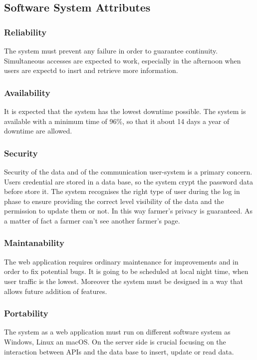 \subsection{Software System Attributes}

\subsubsection{Reliability}
The system must prevent any failure in order to guarantee continuity. 
Simultaneous accesses are expected to work, especially in the afternoon when users are expectd to insrt and retrieve more information.

\subsubsection{Availability}
It is expected that the system has the lowest downtime possible. 
The system is available with a minimum time of 96\%, 
so that it about 14 days a year of downtime are allowed.


\subsubsection{Security}
\label{subsubsection:3.4.3}
Security of the data and of the communication user-system is a primary concern. Users credential are stored in a data base, so the system crypt the password data before store it. The system recognises the right type of user during the log in phase to ensure providing the correct level visibility of the data and the permission to update them or not. In this way farmer’s privacy is guaranteed. As a matter of fact a farmer can’t see another farmer’s page.


\subsubsection{Maintanability}
The web application requires ordinary maintenance for improvements and in order to fix potential bugs. 
It is going to be scheduled at local night time, when user traffic is the lowest.
Moreover the system must be designed in a way that allows future addition of features.

\subsubsection{Portability}
The system as a web application must run on different software system as Windows, Linux an macOS.
On the server side is crucial focusing on the interaction between APIs and the data base to insert, update or read data.

